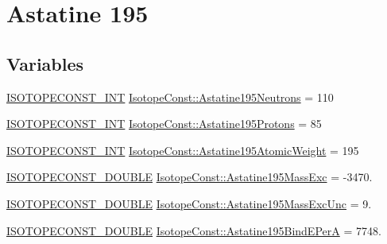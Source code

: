 \hypertarget{group___isotope_const-_astatine-_at195}{}\section{Astatine 195}
\label{group___isotope_const-_astatine-_at195}
\subsection*{Variables}
\begin{DoxyCompactItemize}
\item 
\mbox{\hyperlink{group___isotope_const-_macros_ga5f18360b3e99483a35c32d789e62621c}{I\+S\+O\+T\+O\+P\+E\+C\+O\+N\+S\+T\+\_\+\+I\+NT}} \mbox{\hyperlink{group___isotope_const-_astatine-_at195_ga463dd9dc6826ec622143a71806b84fcb}{Isotope\+Const\+::\+Astatine195\+Neutrons}} = 110
\item 
\mbox{\hyperlink{group___isotope_const-_macros_ga5f18360b3e99483a35c32d789e62621c}{I\+S\+O\+T\+O\+P\+E\+C\+O\+N\+S\+T\+\_\+\+I\+NT}} \mbox{\hyperlink{group___isotope_const-_astatine-_at195_gadab401799dad749adab92abd47c47265}{Isotope\+Const\+::\+Astatine195\+Protons}} = 85
\item 
\mbox{\hyperlink{group___isotope_const-_macros_ga5f18360b3e99483a35c32d789e62621c}{I\+S\+O\+T\+O\+P\+E\+C\+O\+N\+S\+T\+\_\+\+I\+NT}} \mbox{\hyperlink{group___isotope_const-_astatine-_at195_gaa64e22d8d278e02734c570fbc0911b81}{Isotope\+Const\+::\+Astatine195\+Atomic\+Weight}} = 195
\item 
\mbox{\hyperlink{group___isotope_const-_macros_ga8f45a7272ce02c0b4c65c44636ed719a}{I\+S\+O\+T\+O\+P\+E\+C\+O\+N\+S\+T\+\_\+\+D\+O\+U\+B\+LE}} \mbox{\hyperlink{group___isotope_const-_astatine-_at195_gaf0a295c330b1e294dfc0bf7388d5a3ad}{Isotope\+Const\+::\+Astatine195\+Mass\+Exc}} = -\/3470.
\item 
\mbox{\hyperlink{group___isotope_const-_macros_ga8f45a7272ce02c0b4c65c44636ed719a}{I\+S\+O\+T\+O\+P\+E\+C\+O\+N\+S\+T\+\_\+\+D\+O\+U\+B\+LE}} \mbox{\hyperlink{group___isotope_const-_astatine-_at195_ga9b5b6096e983450502dc79a1f8d6e00f}{Isotope\+Const\+::\+Astatine195\+Mass\+Exc\+Unc}} = 9.
\item 
\mbox{\hyperlink{group___isotope_const-_macros_ga8f45a7272ce02c0b4c65c44636ed719a}{I\+S\+O\+T\+O\+P\+E\+C\+O\+N\+S\+T\+\_\+\+D\+O\+U\+B\+LE}} \mbox{\hyperlink{group___isotope_const-_astatine-_at195_gabfa0535360545c1d01bc45dc9e61b9d5}{Isotope\+Const\+::\+Astatine195\+Bind\+E\+PerA}} = 7748.
\item 

\end{DoxyCompactItemize}
